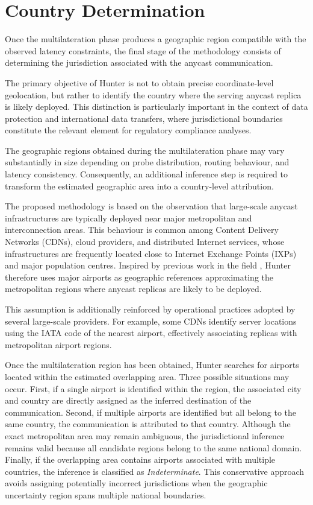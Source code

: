 \section{Country Determination}
\label{sc:hunter_country_determination}

Once the multilateration phase produces a geographic region compatible with the observed latency constraints, the final stage of the methodology consists of determining the jurisdiction associated with the anycast communication.

The primary objective of Hunter is not to obtain precise coordinate-level geolocation, but rather to identify the country where the serving anycast replica is likely deployed. This distinction is particularly important in the context of data protection and international data transfers, where jurisdictional boundaries constitute the relevant element for regulatory compliance analyses.

The geographic regions obtained during the multilateration phase may vary substantially in size depending on probe distribution, routing behaviour, and latency consistency. Consequently, an additional inference step is required to transform the estimated geographic area into a country-level attribution.

The proposed methodology is based on the observation that large-scale anycast infrastructures are typically deployed near major metropolitan and interconnection areas. This behaviour is common among Content Delivery Networks (CDNs), cloud providers, and distributed Internet services, whose infrastructures are frequently located close to Internet Exchange Points (IXPs) and major population centres. Inspired by previous work in the field \cite{Cicalese2016Latency-BasedSets}, Hunter therefore uses major airports as geographic references approximating the metropolitan regions where anycast replicas are likely to be deployed.

This assumption is additionally reinforced by operational practices adopted by several large-scale providers. For example, some CDNs identify server locations using the IATA code of the nearest airport, effectively associating replicas with metropolitan airport regions.

Once the multilateration region has been obtained, Hunter searches for airports located within the estimated overlapping area. Three possible situations may occur. First, if a single airport is identified within the region, the associated city and country are directly assigned as the inferred destination of the communication. Second, if multiple airports are identified but all belong to the same country, the communication is attributed to that country. Although the exact metropolitan area may remain ambiguous, the jurisdictional inference remains valid because all candidate regions belong to the same national domain. Finally, if the overlapping area contains airports associated with multiple countries, the inference is classified as \textit{Indeterminate}. This conservative approach avoids assigning potentially incorrect jurisdictions when the geographic uncertainty region spans multiple national boundaries.

